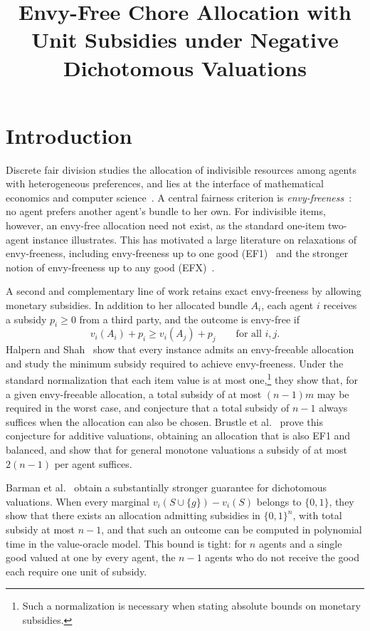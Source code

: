 \documentclass[sigconf,anonymous]{aamas}
\title{Envy-Free Chore Allocation with Unit Subsidies under Negative Dichotomous Valuations}
\author{}
\affiliation{
  \institution{}
  \city{}
  \country{}}
\author{}
\affiliation{
  \institution{}
  \city{}
  \country{}}
\theoremstyle{acmplain}
\theoremstyle{acmdefinition}
\theoremstyle{acmplain}
\begin{document}
\maketitle

\section{Introduction}
\label{sec:intro}
Discrete fair division studies the allocation of indivisible resources among agents with heterogeneous preferences, and lies at the interface of mathematical economics and computer science~\cite{BCE16,End17}. A central fairness criterion is \emph{envy-freeness}~\cite{Fol67,Var74}: no agent prefers another agent's bundle to her own. For indivisible items, however, an envy-free allocation need not exist, as the standard one-item two-agent instance illustrates. This has motivated a large literature on relaxations of envy-freeness, including envy-freeness up to one good (EF1)~\cite{Bud11,LMMS04} and the stronger notion of envy-freeness up to any good (EFX)~\cite{CKMPSW19}.

A second and complementary line of work retains exact envy-freeness by allowing monetary subsidies. In addition to her allocated bundle $A_i$, each agent $i$ receives a subsidy $p_i\geq 0$ from a third party, and the outcome is envy-free if
\[v_i(A_i)+p_i \geq v_i(A_j)+p_j
    \qquad\text{for all }i,j.\]
Halpern and Shah~\cite{HS19} show that every instance admits an envy-freeable allocation and study the minimum subsidy required to achieve envy-freeness. Under the standard normalization that each item value is at most one,\footnote{Such a normalization is necessary when stating absolute bounds on monetary subsidies.} they show that, for a given envy-freeable allocation, a total subsidy of at most $(n-1)m$ may be required in the worst case, and conjecture that a total subsidy of $n-1$ always suffices when the allocation can also be chosen. Brustle et al.~\cite{BDNSV20} prove this conjecture for additive valuations, obtaining an allocation that is also EF1 and balanced, and show that for general monotone valuations a subsidy of at most $2(n-1)$ per agent suffices.

Barman et al.~\cite{BKNS22} obtain a substantially stronger guarantee for dichotomous valuations. When every marginal $v_i(S\cup\{g\})-v_i(S)$ belongs to $\{0,1\}$, they show that there exists an allocation admitting subsidies in $\{0,1\}^n$, with total subsidy at most $n-1$, and that such an outcome can be computed in polynomial time in the value-oracle model. This bound is tight: for $n$ agents and a single good valued at one by every agent, the $n-1$ agents who do not receive the good each require one unit of subsidy.
\end{document}
